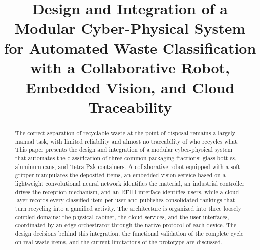 \documentclass[conference]{IEEEtran}
\begin{document}
\title{Design and Integration of a Modular Cyber-Physical System for Automated Waste Classification with a Collaborative Robot, Embedded Vision, and Cloud Traceability}

\author{
}

\maketitle

\begin{abstract}
The correct separation of recyclable waste at the point of disposal remains a largely manual task, with limited reliability and almost no traceability of who recycles what. This paper presents the design and integration of a modular cyber-physical system that automates the classification of three common packaging fractions: glass bottles, aluminum cans, and Tetra Pak containers. A collaborative robot equipped with a soft gripper manipulates the deposited items, an embedded vision service based on a lightweight convolutional neural network identifies the material, an industrial controller drives the reception mechanism, and an RFID interface identifies users, while a cloud layer records every classified item per user and publishes consolidated rankings that turn recycling into a gamified activity. The architecture is organized into three loosely coupled domains: the physical cabinet, the cloud services, and the user interfaces, coordinated by an edge orchestrator through the native protocol of each device. The design decisions behind this integration, the functional validation of the complete cycle on real waste items, and the current limitations of the prototype are discussed.
\end{abstract}
\end{document}
